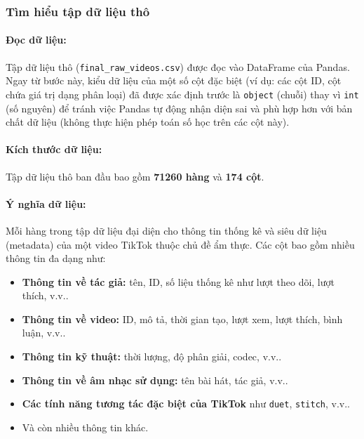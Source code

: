 \subsubsection{Tìm hiểu tập dữ liệu thô}

\paragraph{Đọc dữ liệu:}
Tập dữ liệu thô (\texttt{final\_raw\_videos.csv}) được đọc vào DataFrame của Pandas. Ngay từ bước này, kiểu dữ liệu của một số cột đặc biệt (ví dụ: các cột ID, cột chứa giá trị dạng phân loại) đã được xác định trước là \texttt{object} (chuỗi) thay vì \texttt{int} (số nguyên) để tránh việc Pandas tự động nhận diện sai và phù hợp hơn với bản chất dữ liệu (không thực hiện phép toán số học trên các cột này).

\paragraph{Kích thước dữ liệu:}
Tập dữ liệu thô ban đầu bao gồm \textbf{71260 hàng} và \textbf{174 cột}.

\paragraph{Ý nghĩa dữ liệu:} 
Mỗi hàng trong tập dữ liệu đại diện cho thông tin thống kê và siêu dữ liệu (metadata) của một video TikTok thuộc chủ đề ẩm thực. Các cột bao gồm nhiều thông tin đa dạng như:
\begin{itemize}
    \item \textbf{Thông tin về tác giả:} tên, ID, số liệu thống kê như lượt theo dõi, lượt thích, v.v..
    
    \item \textbf{Thông tin về video:} ID, mô tả, thời gian tạo, lượt xem, lượt thích, bình luận, v.v..
    
    \item \textbf{Thông tin kỹ thuật:} thời lượng, độ phân giải, codec, v.v..
    
    \item \textbf{Thông tin về âm nhạc sử dụng:} tên bài hát, tác giả, v.v..
    
    \item \textbf{Các tính năng tương tác đặc biệt của TikTok} như \texttt{duet}, \texttt{stitch}, v.v..
    
    \item Và còn nhiều thông tin khác.
\end{itemize}

